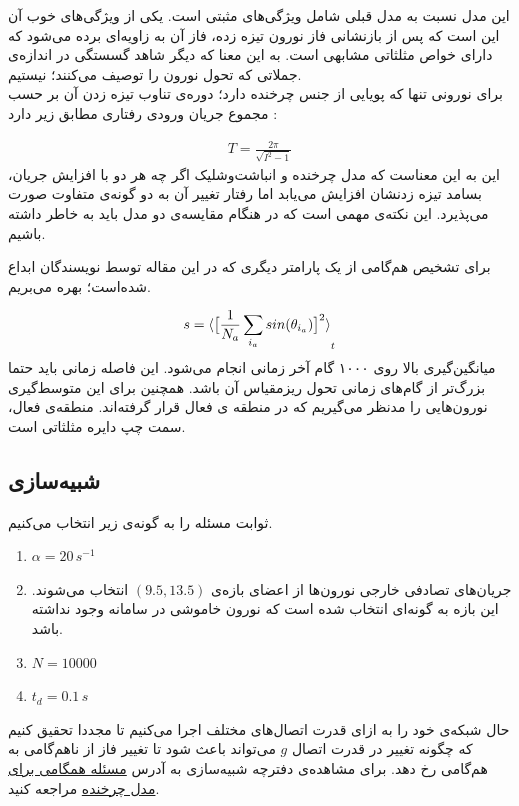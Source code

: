 \documentclass[12pt,onecolumn,a4paper]{article}
\begin{document}
این مدل نسبت به مدل قبلی شامل ویژگی‌های مثبتی است. یکی از ویژگی‌های خوب آن این است که پس از بازنشانی فاز نورون تیزه زده، فاز آن به زاویه‌ای برده می‌شود که دارای خواص مثلثاتی مشابهی است. به این معنا که دیگر شاهد گسستگی در اندازه‌ی جملاتی که تحول نورون را توصیف می‌کنند؛ نیستیم.\\
برای نورونی تنها که پویایی از جنس چرخنده دارد؛ دوره‌ی تناوب تیزه زدن آن بر حسب مجموع جریان ورودی‌ رفتاری مطابق زیر دارد \cite{safaeesirat2020critical}:

\begin{align}
T = \frac{2\pi}{\sqrt{I^2 - 1}}
\end{align}
این به این معناست که مدل چرخنده و انباشت‌وشلیک اگر چه هر دو با افزایش جریان، بسامد تیزه زدنشان افزایش می‌یابد اما رفتار تغییر آن به دو گونه‌ی متفاوت صورت می‌پذیرد. این نکته‌ی مهمی است که در هنگام مقایسه‌ی دو مدل باید به خاطر داشته باشیم.

برای تشخیص هم‌گامی از یک پارامتر دیگری که در این مقاله \cite{safaeesirat2020critical}  توسط نویسندگان ابداع شده‌است؛ بهره می‌بریم.

\begin{equation}
s =  \braket{ \big[ \frac{1}{N_a}\sum_{i_a} sin(\theta_{i_a}) \big]^{2}}_t
\label{eq:saman_amin_param}
\end{equation}
میانگین‌گیری بالا روی ۱۰۰۰ گام آخر زمانی انجام می‌شود. این فاصله زمانی باید حتما بزرگ‌تر از گام‌های زمانی تحول ریزمقیاس آن باشد. همچنین برای این متوسط‌گیری نورون‌هایی را مدنظر می‌گیریم که در منطقه ی فعال قرار گرفته‌اند. منطقه‌ی فعال، سمت چپ دایره مثلثاتی است.
\subsection{شبیه‌سازی}
ثوابت مسئله را به گونه‌ی زیر انتخاب می‌کنیم.
\begin{tcolorbox}[colback=green!5!white,colframe=green!75!black]
\begin{enumerate}[*]
\item
$\alpha = 20\, s^{-1}$
\item
جریان‌های تصادفی خارجی نورون‌ها از اعضای بازه‌ی $(9.5,13.5)$ انتخاب می‌شوند. این بازه به گونه‌ای انتخاب شده است که نورون خاموشی در سامانه وجود نداشته باشد.
\item
$N = 10000$
\item
$t_d = 0.1\, s$ 
\end{enumerate}
\end{tcolorbox}
حال شبکه‌ی خود را به ازای قدرت اتصال‌های مختلف اجرا می‌کنیم تا مجددا تحقیق کنیم که چگونه تغییر در قدرت اتصال $g$ می‌تواند باعث شود تا تغییر فاز از ناهم‌گامی به هم‌گامی رخ دهد. برای مشاهده‌ی دفترچه شبیه‌سازی به آدرس 
\href{run://..//scripts//rotational_model}{مسئله همگامی برای مدل چرخنده}
مراجعه کنید.
\end{document}

